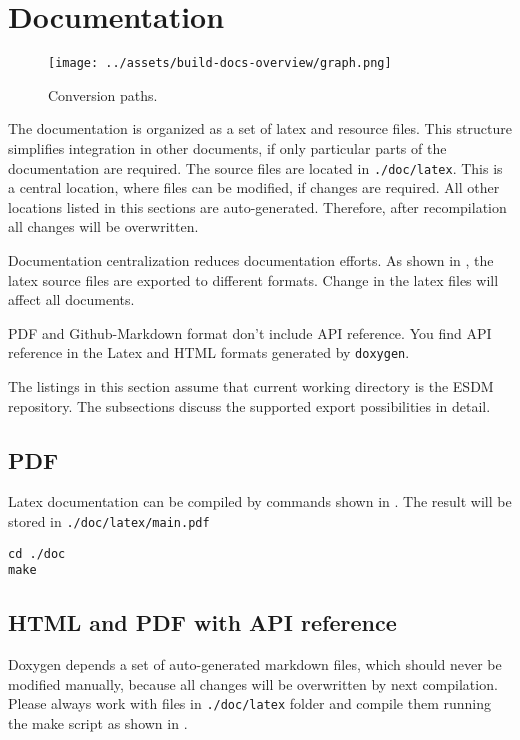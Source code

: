 \section{Documentation}

\begin{figure}[!ht]
  \begin{center}
    \texttt{[image: ../assets/build-docs-overview/graph.png]}
  \end{center}
  \caption{Conversion paths.}
  \label{fig:build-docs-overview}
\end{figure}

The documentation is organized as a set of latex and resource files.
This structure simplifies integration in other documents, if only particular parts of the documentation are required.
The source files are located in \lstinline|./doc/latex|.
This is a central location, where files can be modified, if changes are required.
All other locations listed in this sections are auto-generated.
Therefore, after recompilation all changes will be overwritten.

Documentation centralization reduces documentation efforts.
As shown in , the latex source files are exported to different formats.
Change in the latex files will affect all documents.

PDF and Github-Markdown format don't include API reference.
You find API reference in the Latex and HTML formats generated by \lstinline|doxygen|.

The listings in this section assume that current working directory is the ESDM repository.
The subsections discuss the supported export possibilities in detail.

\subsection{PDF}
Latex documentation can be compiled by commands shown in .
The result will be stored in \lstinline|./doc/latex/main.pdf|

\begin{lstlisting}[caption={Make PDF document},label={code:doc:latex}]
cd ./doc
make
\end{lstlisting}


\subsection{HTML and PDF with API reference}
Doxygen depends a set of auto-generated markdown files, which should never be modified manually, because all changes will be overwritten by next compilation.
Please always work with files in \lstinline|./doc/latex| folder and compile them running the make script as shown in .

